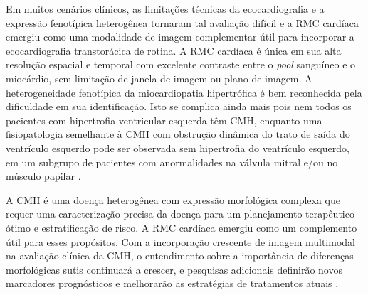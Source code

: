 Em muitos cenários clínicos, as limitações técnicas da ecocardiografia e a expressão fenotípica heterogênea tornaram tal avaliação difícil e a \gls{RMC} cardíaca emergiu como uma modalidade de imagem complementar útil para incorporar a ecocardiografia transtorácica de rotina. A \gls{RMC} cardíaca é única em sua alta resolução espacial e temporal com excelente contraste entre o \textit{pool} sanguíneo e o miocárdio, sem limitação de janela de imagem ou plano de imagem.
A heterogeneidade fenotípica da miocardiopatia hipertrófica é bem reconhecida pela dificuldade em sua identificação. Isto se complica ainda mais pois nem todos os pacientes com hipertrofia ventricular esquerda têm \gls{CMH}, enquanto uma fisiopatologia semelhante à \gls{CMH} com obstrução dinâmica do trato de saída do ventrículo esquerdo pode ser observada sem hipertrofia do ventrículo esquerdo, em um subgrupo de pacientes com anormalidades na válvula mitral e/ou no músculo papilar \cite{pontoneClinicalApplicationsCardiac2022}.

A \gls{CMH} é uma doença heterogênea com expressão morfológica complexa que requer uma caracterização precisa da doença para um planejamento terapêutico ótimo e estratificação de risco. A \gls{RMC} cardíaca emergiu como um complemento útil para esses propósitos. Com a incorporação crescente de imagem multimodal na avaliação clínica da \gls{CMH}, o entendimento sobre a importância de diferenças morfológicas sutis continuará a crescer, e pesquisas adicionais definirão novos marcadores prognósticos e melhorarão as estratégias de tratamentos atuais \cite{toCardiacMagneticResonance2011c}.




